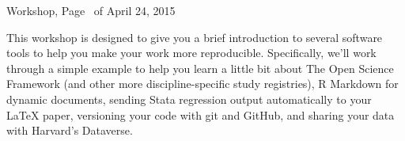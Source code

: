 \documentclass[addpoints,10pt]{exam}
\begin{document}
\firstpageheadrule
{}
              {Workshop, Page \thepage\ of \numpages}
              {April 24, 2015}



This workshop is designed to give you a brief introduction to several software tools to help you make your work more reproducible. Specifically, we'll work through a simple example to help you learn a little bit about The Open Science Framework (and other more discipline-specific study registries), R Markdown for dynamic documents, sending Stata regression output automatically to your LaTeX paper, versioning your code with git and GitHub, and sharing your data with Harvard's Dataverse.
\end{document}
